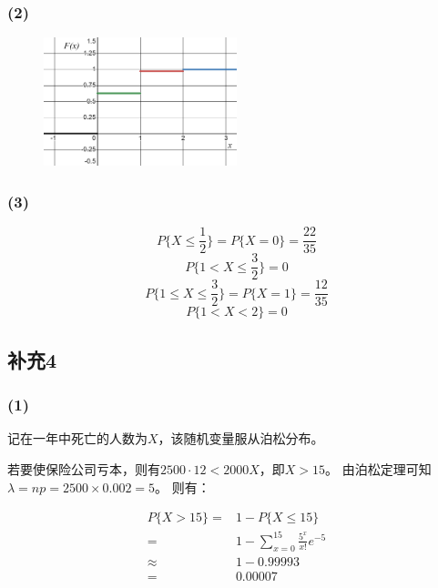 \documentclass[a4paper,12pt]{ctexart}
\begin{document}
\subsubsection*{(2)}

\begin{figure}[H]
	\centering
	\includegraphics[width=0.5\textwidth]{Figure3.png}
\end{figure}

\subsubsection*{(3)}

\begin{equation*}
	P\{X \leq \frac{1}{2}\} = P\{X = 0\} = \frac{22}{35}
\end{equation*}
\begin{equation*}
	P\{1 < X \leq \frac{3}{2}\} = 0
\end{equation*}
\begin{equation*}
	P\{1 \leq X \leq \frac{3}{2}\} = P\{X = 1\} = \frac{12}{35}
\end{equation*}
\begin{equation*}
	P\{1 < X < 2\} = 0
\end{equation*}

\subsection*{补充4}

\subsubsection*{(1)}

记在一年中死亡的人数为$X$，该随机变量服从泊松分布。

若要使保险公司亏本，则有$2500 \cdot 12 < 2000 X$，即$X > 15$。
由泊松定理可知$\lambda = np = 2500 \times 0.002 = 5$。
则有：

\begin{align*}
	P\{X > 15\} =& 1 - P\{X \leq 15\}\\
	=& 1 - \sum_{x = 0}^{15} \frac{5^x}{x!} e^{-5}\\
	\approx& 1 - 0.99993\\
	=& 0.00007
\end{align*}
\end{document}
